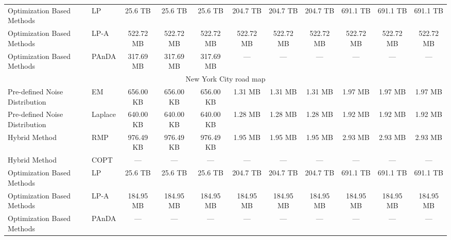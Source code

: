 \begin{table}[t]
{\begin{tabular}{ll|ccc|ccc|ccc}
Optimization Based Methods & LP & 25.6 TB & 25.6 TB & 25.6 TB & 204.7 TB & 204.7 TB & 204.7 TB & 691.1 TB & 691.1 TB & 691.1 TB \\
Optimization Based Methods & LP-A & 522.72 MB & 522.72 MB & 522.72 MB & 522.72 MB & 522.72 MB & 522.72 MB & 522.72 MB & 522.72 MB & 522.72 MB \\
Optimization Based Methods & PAnDA & 317.69 MB & 317.69 MB & 317.69 MB & --- & --- & --- & --- & --- & --- \\
\hline
\multicolumn{11}{c}{New York City road map} \\
\hline
Pre-defined Noise Distribution & EM & 656.00 KB & 656.00 KB & 656.00 KB & 1.31 MB & 1.31 MB & 1.31 MB & 1.97 MB & 1.97 MB & 1.97 MB \\
Pre-defined Noise Distribution & Laplace & 640.00 KB & 640.00 KB & 640.00 KB & 1.28 MB & 1.28 MB & 1.28 MB & 1.92 MB & 1.92 MB & 1.92 MB \\
Hybrid Method & RMP & 976.49 KB & 976.49 KB & 976.49 KB & 1.95 MB & 1.95 MB & 1.95 MB & 2.93 MB & 2.93 MB & 2.93 MB \\
Hybrid Method & COPT & --- & --- & --- & --- & --- & --- & --- & --- & --- \\
Optimization Based Methods & LP & 25.6 TB & 25.6 TB & 25.6 TB & 204.7 TB & 204.7 TB & 204.7 TB & 691.1 TB & 691.1 TB & 691.1 TB \\
Optimization Based Methods & LP-A & 184.95 MB & 184.95 MB & 184.95 MB & 184.95 MB & 184.95 MB & 184.95 MB & 184.95 MB & 184.95 MB & 184.95 MB \\
Optimization Based Methods & PAnDA & --- & --- & --- & --- & --- & --- & --- & --- & --- \\
\hline
\end{tabular}%
}
\end{table}
